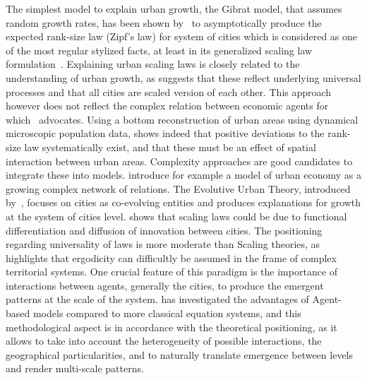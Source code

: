 The simplest model to explain urban growth, the Gibrat model, that assumes random growth rates, has been shown by~\cite{gabaix1999zipf} to asymptotically produce the expected rank-size law (Zipf's law) for system of cities which is considered as one of the most regular stylized facts, at least in its generalized scaling law formulation~\citep{nitsch2005zipf}. Explaining urban scaling laws is closely related to the understanding of urban growth, as \cite{bettencourt2008large} suggests that these reflect underlying universal processes and that all cities are scaled version of each other. This approach however does not reflect the complex relation between economic agents for which~\cite{storper2009rethinking} advocates. Using a bottom reconstruction of urban areas using dynamical microscopic population data, \cite{rozenfeld2008laws} shows indeed that positive deviations to the rank-size law systematically exist, and that these must be an effect of spatial interaction between urban areas. Complexity approaches are good candidates to integrate these into models. \cite{andersson2006complex} introduce for example a model of urban economy as a growing complex network of relations. The Evolutive Urban Theory, introduced by~\cite{pumain1997pour}, focuses on cities as co-evolving entities and produces explanations for growth at the system of cities level. \cite{pumain2006evolutionary} shows that scaling laws could be due to functional differentiation and diffusion of innovation between cities. The positioning regarding universality of laws is more moderate than Scaling theories, as \cite{pumain2012urban} highlights that ergodicity can difficultly be assumed in the frame of complex territorial systems. One crucial feature of this paradigm is the importance of interactions between agents, generally the cities, to produce the emergent patterns at the scale of the system. \cite{pumain2013theoretical} has investigated the advantages of Agent-based models compared to more classical equation systems, and this methodological aspect is in accordance with the theoretical positioning, as it allows to take into account the heterogeneity of possible interactions, the geographical particularities, and to naturally translate emergence between levels and render multi-scale patterns.


